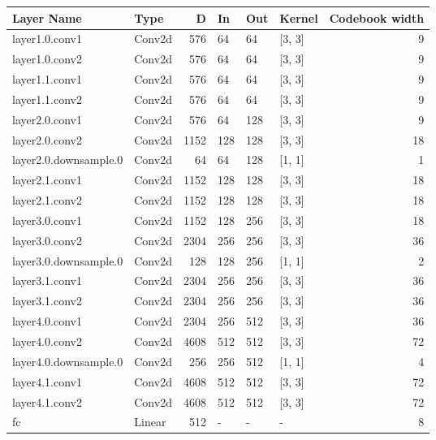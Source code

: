 \begin{table}
\centering
\begin{tabular}{llrlllr}
\toprule
Layer Name & Type & D & In & Out & Kernel & Codebook width \\
\midrule
layer1.0.conv1 & Conv2d & 576 & 64 & 64 & [3, 3] & 9 \\
layer1.0.conv2 & Conv2d & 576 & 64 & 64 & [3, 3] & 9 \\
layer1.1.conv1 & Conv2d & 576 & 64 & 64 & [3, 3] & 9 \\
layer1.1.conv2 & Conv2d & 576 & 64 & 64 & [3, 3] & 9 \\
layer2.0.conv1 & Conv2d & 576 & 64 & 128 & [3, 3] & 9 \\
layer2.0.conv2 & Conv2d & 1152 & 128 & 128 & [3, 3] & 18 \\
layer2.0.downsample.0 & Conv2d & 64 & 64 & 128 & [1, 1] & 1 \\
layer2.1.conv1 & Conv2d & 1152 & 128 & 128 & [3, 3] & 18 \\
layer2.1.conv2 & Conv2d & 1152 & 128 & 128 & [3, 3] & 18 \\
layer3.0.conv1 & Conv2d & 1152 & 128 & 256 & [3, 3] & 18 \\
layer3.0.conv2 & Conv2d & 2304 & 256 & 256 & [3, 3] & 36 \\
layer3.0.downsample.0 & Conv2d & 128 & 128 & 256 & [1, 1] & 2 \\
layer3.1.conv1 & Conv2d & 2304 & 256 & 256 & [3, 3] & 36 \\
layer3.1.conv2 & Conv2d & 2304 & 256 & 256 & [3, 3] & 36 \\
layer4.0.conv1 & Conv2d & 2304 & 256 & 512 & [3, 3] & 36 \\
layer4.0.conv2 & Conv2d & 4608 & 512 & 512 & [3, 3] & 72 \\
layer4.0.downsample.0 & Conv2d & 256 & 256 & 512 & [1, 1] & 4 \\
layer4.1.conv1 & Conv2d & 4608 & 512 & 512 & [3, 3] & 72 \\
layer4.1.conv2 & Conv2d & 4608 & 512 & 512 & [3, 3] & 72 \\
fc & Linear & 512 & - & - & - & 8 \\
\bottomrule
\end{tabular}
\end{table}
